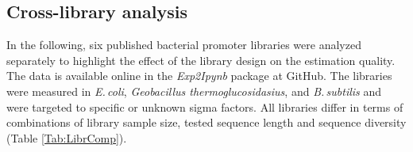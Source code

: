 \documentclass[utf8]{frontiersSCNS} %
\begin{document}


\subsection{Cross-library analysis}
In the following, six published bacterial promoter libraries were analyzed separately to highlight the effect of the library design on the estimation quality. The data is available online in the \textit{Exp2Ipynb} package at GitHub. The libraries were measured in \textit{E.\,coli}, \textit{Geobacillus thermoglucosidasius}, and \textit{B.\,subtilis} and were targeted to specific or unknown sigma factors. All libraries differ in terms of combinations of library sample size, tested sequence length and sequence diversity (Table \ref{Tab:LibrComp}). 
\end{document}
